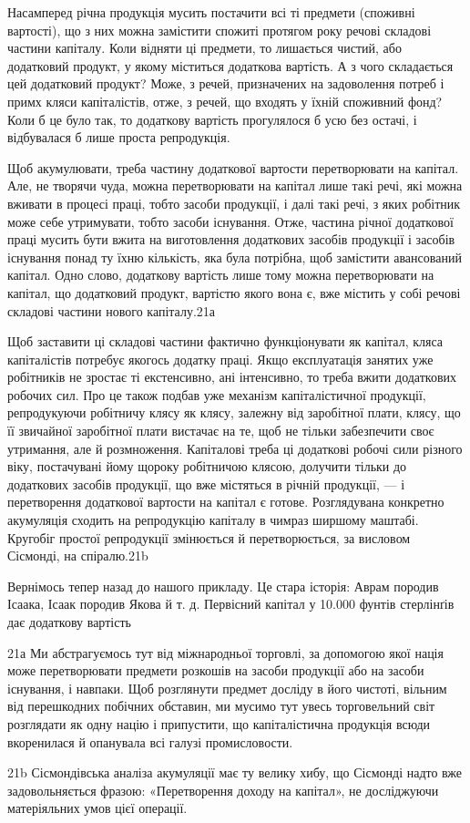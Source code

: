 Насамперед річна продукція мусить постачити всі ті предмети
(споживні вартості), що з них можна замістити спожиті
протягом року речові складові частини капіталу. Коли відняти
ці предмети, то лишається чистий, або додатковий продукт, у
якому міститься додаткова вартість. А з чого складається цей
додатковий продукт? Може, з речей, призначених на задоволення
потреб і примх кляси капіталістів, отже, з речей, що входять
у їхній споживний фонд? Коли б це було так, то додаткову
вартість прогулялося б усю без остачі, і відбувалася б лише
проста репродукція.

Щоб акумулювати, треба частину додаткової вартости перетворювати
на капітал. Але, не творячи чуда, можна перетворювати
на капітал лише такі речі, які можна вживати в процесі
праці, тобто засоби продукції, і далі такі речі, з яких робітник
може себе утримувати, тобто засоби існування. Отже, частина
річної додаткової праці мусить бути вжита на виготовлення додаткових
засобів продукції і засобів існування понад ту їхню
кількість, яка була потрібна, щоб замістити авансований капітал.
Одно слово, додаткову вартість лише тому можна перетворювати
на капітал, що додатковий продукт, вартістю якого вона
є, вже містить у собі речові складові частини нового капіталу.21а

Щоб заставити ці складові частини фактично функціонувати
як капітал, кляса капіталістів потребує якогось додатку праці.
Якщо експлуатація занятих уже робітників не зростає ті екстенсивно,
ані інтенсивно, то треба вжити додаткових робочих сил.
Про це також подбав уже механізм капіталістичної продукції,
репродукуючи робітничу клясу як клясу, залежну від заробітної
плати, клясу, що її звичайної заробітної плати вистачає на
те, щоб не тільки забезпечити своє утримання, але й розмноження.
Капіталові треба ці додаткові робочі сили різного віку, постачувані
йому щороку робітничою клясою, долучити тільки до
додаткових засобів продукції, що вже містяться в річній продукції,
— і перетворення додаткової вартости на капітал є готове.
Розглядувана конкретно акумуляція сходить на репродукцію
капіталу в чимраз ширшому маштабі. Кругобіг простої репродукції
змінюється й перетворюється, за висловом Сісмонді, на
спіралю.21b

Вернімось тепер назад до нашого прикладу. Це стара історія:
Аврам породив Ісаака, Ісаак породив Якова й т. д. Первісний
капітал у 10.000 фунтів стерлінґів дає додаткову вартість

21а Ми абстрагуємось тут від міжнародньої торговлі, за допомогою
якої нація може перетворювати предмети розкошів на засоби продукції
або на засоби існування, і навпаки. Щоб розглянути предмет досліду в
його чистоті, вільним від перешкодних побічних обставин, ми мусимо тут
увесь торговельний світ розглядати як одну націю і припустити, що капіталістична
продукція всюди вкоренилася й опанувала всі галузі промисловости.

21b Сісмондівська аналіза акумуляції має ту велику хибу, що Сісмонді
надто вже задовольняється фразою: «Перетворення доходу на капітал»,
не досліджуючи матеріяльних умов цієї операції.
